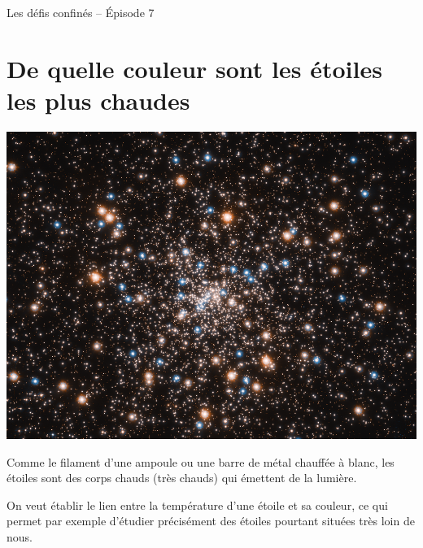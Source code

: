 \documentclass[12pt,a4paper]{article}
\begin{document}
\begin{header}
Les défis confinés -- Épisode 7
\end{header}

\section*{De quelle couleur sont les étoiles les plus chaudes}

\begin{multicols}{2}
\begin{center}
\includegraphics[trim=0 130 0 130, clip, width=\linewidth]{images/hubble_globular_cluster.png}
\end{center}

Comme le filament d'une ampoule ou une barre de métal chauffée à blanc, les étoiles sont des corps chauds (très chauds) qui émettent de la lumière.

On veut établir le lien entre la température d'une étoile et sa couleur, ce qui permet par exemple d'étudier précisément des étoiles pourtant situées très loin de nous.
\end{multicols}
\end{document}
